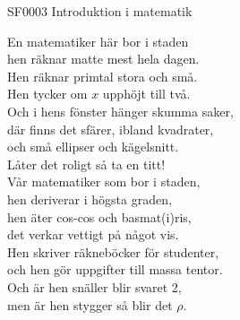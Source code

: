 \documentclass[a6paper,10pt]{article}
\begin{document}
\setlength{\oddsidemargin}{-0.47in}
\noindent
\begin{center}
\footnotesize SF0003 Introduktion i matematik\\
\end{center}
\begin{lyrics}
En matematiker här bor i staden \\
hen räknar matte mest hela dagen. \\
Hen räknar primtal stora och små. \\
Hen tycker om $x$ upphöjt till två. \\
Och i hens fönster hänger skumma saker, \\
där finns det sfärer, ibland kvadrater, \\
och små ellipser och kägelsnitt. \\
Låter det roligt så ta en titt! 
\vspace{5pt} \\
Vår matematiker som bor i staden, \\
hen deriverar i högsta graden, \\
hen äter cos-cos och basmat(i)ris, \\
det verkar vettigt på något vis. \\
Hen skriver räkneböcker för studenter, \\
och hen gör uppgifter till massa tentor. \\
Och är hen snäller blir svaret 2, \\
men är hen stygger så blir det $\rho$. 
\end{lyrics}
\end{document}
